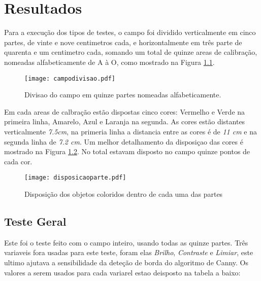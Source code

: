 \chapter{Resultados} 

Para a execução dos tipos de testes, o campo foi dividido verticalmente em cinco partes, de vinte e nove centimetros cada, e horizontalmente em três parte de quarenta e um centimetro cada, somando um total de quinze areas de calibração, nomeadas alfabeticamente de A à O, como mostrado na Figura \ref{campodivisao}.

\begin{figure}[!: h]
		\centering
		\texttt{[image: campodivisao.pdf]}
		\caption{Divisao do campo em quinze partes nomeadas alfabeticamente.}
		\label{campodivisao}
	\end{figure}
	
Em cada areas de calbração estão dispostas cinco cores: Vermelho  e Verde na primeira linha, Amarelo, Azul e Laranja na segunda. As cores estão distantes verticalmente \textit{7.5cm}, na primeria linha a distancia entre as cores é  de \textit{11 cm} e na segunda linha de \textit{7.2 cm}. Um  melhor detalhamento da disposiçao das cores é  mostrado na Figura \ref{disposicaoparte}. No total estavam disposto no campo quinze pontos de cada cor.

\begin{figure}[!: h]
		\centering
		\texttt{[image: disposicaoparte.pdf]}
		\caption{Disposição dos objetos coloridos dentro de cada uma das partes}
		\label{disposicaoparte}
	\end{figure}
	
\section{Teste Geral}
Este foi o teste feito com o campo inteiro, usando todas as quinze partes. Três variaveis fora usadas para este teste, foram elas \textit{Brilho}, \textit{Contraste} e  \textit{Limiar}, este ultimo ajutava a sensibilidade da deteção de borda do algoritmo de Canny. Os valores a serem usados para cada variarel estao deisposto na tabela a baixo:

